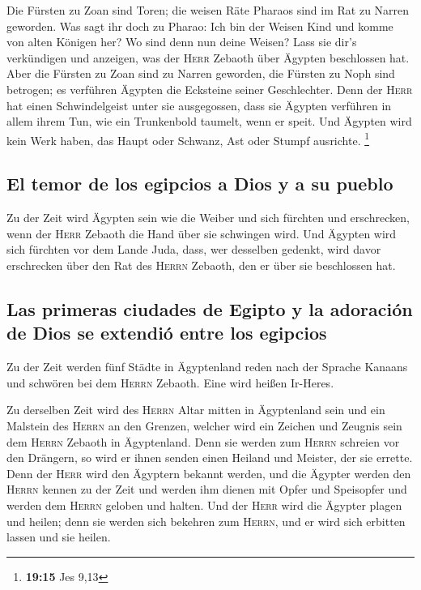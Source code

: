  Die Fürsten zu Zoan sind Toren; die weisen Räte Pharaos
sind im Rat zu Narren geworden. Was sagt ihr doch zu Pharao: Ich bin der
Weisen Kind und komme von alten Königen her?  Wo sind
denn nun deine Weisen? Lass sie dir's verkündigen und anzeigen, was der
\textsc{Herr} Zebaoth über Ägypten beschlossen hat.  Aber
die Fürsten zu Zoan sind zu Narren geworden, die Fürsten zu Noph sind
betrogen; es verführen Ägypten die Ecksteine seiner Geschlechter.
 Denn der \textsc{Herr} hat einen Schwindelgeist unter
sie ausgegossen, dass sie Ägypten verführen in allem ihrem Tun, wie ein
Trunkenbold taumelt, wenn er speit.  Und Ägypten wird
kein Werk haben, das Haupt oder Schwanz, Ast oder Stumpf ausrichte.
\footnote{\textbf{19:15} Jes 9,13}

\hypertarget{el-temor-de-los-egipcios-a-dios-y-a-su-pueblo}{%
\subsection{El temor de los egipcios a Dios y a su
pueblo}\label{el-temor-de-los-egipcios-a-dios-y-a-su-pueblo}}

 Zu der Zeit wird Ägypten sein wie die Weiber und sich
fürchten und erschrecken, wenn der \textsc{Herr} Zebaoth die Hand über
sie schwingen wird.  Und Ägypten wird sich fürchten vor
dem Lande Juda, dass, wer desselben gedenkt, wird davor erschrecken über
den Rat des \textsc{Herrn} Zebaoth, den er über sie beschlossen hat.

\hypertarget{las-primeras-ciudades-de-egipto-y-la-adoraciuxf3n-de-dios-se-extendiuxf3-entre-los-egipcios}{%
\subsection{Las primeras ciudades de Egipto y la adoración de Dios se
extendió entre los
egipcios}\label{las-primeras-ciudades-de-egipto-y-la-adoraciuxf3n-de-dios-se-extendiuxf3-entre-los-egipcios}}

 Zu der Zeit werden fünf Städte in Ägyptenland reden nach
der Sprache Kanaans und schwören bei dem \textsc{Herrn} Zebaoth. Eine
wird heißen Ir-Heres.

 Zu derselben Zeit wird des \textsc{Herrn} Altar mitten
in Ägyptenland sein und ein Malstein des \textsc{Herrn} an den Grenzen,
 welcher wird ein Zeichen und Zeugnis sein dem
\textsc{Herrn} Zebaoth in Ägyptenland. Denn sie werden zum
\textsc{Herrn} schreien vor den Drängern, so wird er ihnen senden einen
Heiland und Meister, der sie errette.  Denn der
\textsc{Herr} wird den Ägyptern bekannt werden, und die Ägypter werden
den \textsc{Herrn} kennen zu der Zeit und werden ihm dienen mit Opfer
und Speisopfer und werden dem \textsc{Herrn} geloben und halten.
 Und der \textsc{Herr} wird die Ägypter plagen und
heilen; denn sie werden sich bekehren zum \textsc{Herrn}, und er wird
sich erbitten lassen und sie heilen.

